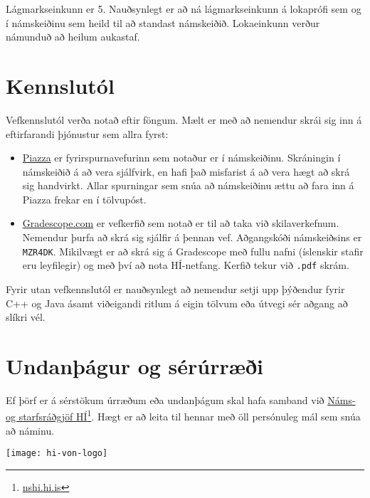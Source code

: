 \documentclass{article}
\begin{document}
Lágmarkseinkunn er 5. Nauðsynlegt er að ná lágmarkseinkunn á lokaprófi sem og í námskeiðinu sem heild til að standast námskeiðið. Lokaeinkunn verður námunduð að heilum aukastaf.

\section{Kennslutól}
\label{sec:tools}
Vefkennslutól verða notað eftir föngum. Mælt er með að nemendur skrái sig inn á eftirfarandi þjónustur sem allra fyrst:
\begin{itemize}
 \item \href{https://piazza.com/hi.is/spring2018/tl203g}{Piazza} er fyrirspurnavefurinn sem notaður er í námskeiðinu. Skráningin í námskeiðið á að vera sjálfvirk, en hafi það misfarist á að vera hægt að skrá sig handvirkt. Allar spurningar sem snúa að námskeiðinu ættu að fara inn á Piazza frekar en í tölvupóst.
 \item \href{https://gradescope.com/courses/14122}{Gradescope.com} er vefkerfið sem notað er til að taka við skilaverkefnum. Nemendur þurfa að skrá sig sjálfir á þennan vef. Aðgangskóði námskeiðsins er \texttt{MZR4DK}. Mikilvægt er að skrá sig á Gradescope með fullu nafni (íslenskir stafir eru leyfilegir) og með því að nota HÍ-netfang. Kerfið tekur við \texttt{.pdf} skrám.
\end{itemize}
Fyrir utan vefkennslutól er nauðsynlegt að nemendur setji upp þýðendur fyrir C++ og Java ásamt viðeigandi ritlum á eigin tölvum eða útvegi sér aðgang að slíkri vél.

\section{Undanþágur og sérúrræði}

Ef þörf er á sérstökum úrræðum eða undanþágum skal hafa samband við \href{http://nshi.hi.is/}{Náms- og starfsráðgjöf HÍ}\footnote{\url{nshi.hi.is}}. Hægt er að leita til hennar með öll persónuleg mál sem snúa að náminu.

\vfill
\texttt{[image: hi-von-logo]}
\end{document}
